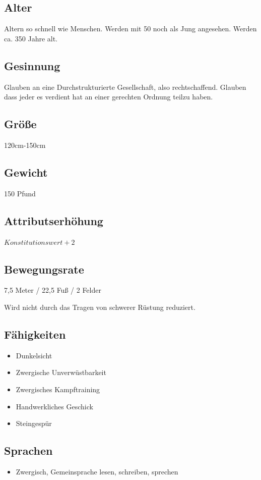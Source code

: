 \subsection*{Alter}
Altern so schnell wie Menschen. Werden mit 50 noch als Jung angesehen. Werden ca. 350 Jahre alt.

\subsection*{Gesinnung}
Glauben an eine Durchstrukturierte Gesellschaft, also rechtschaffend. Glauben dass jeder es verdient hat an einer gerechten Ordnung teilzu haben.
\subsection*{Größe}
120cm-150cm

\subsection*{Gewicht}
150 Pfund

\subsection*{Attributserhöhung}
$Konstitutionswert + 2$

\subsection*{Bewegungsrate}
7,5 Meter / 22,5 Fuß / 2 Felder

Wird nicht durch das Tragen von schwerer Rüstung reduziert.

\subsection*{Fähigkeiten}
\begin{itemize}
	\item Dunkelsicht
	\item Zwergische Unverwüstbarkeit
	\item Zwergisches Kampftraining
	\item Handwerkliches Geschick
	\item Steingespür
\end{itemize}

\subsection*{Sprachen}
\begin{itemize}
	\item Zwergisch, Gemeinsprache
	\subitem lesen, schreiben, sprechen
\end{itemize}


